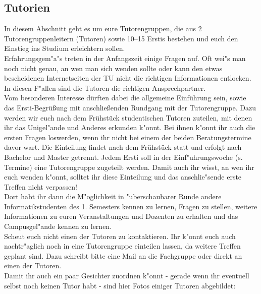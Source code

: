 \subsection{Tutorien}



In diesem Abschnitt geht es um eure Tutorengruppen, die aus 2 Tutorengruppenleitern (Tutoren) sowie 10--15 Erstis bestehen und euch den Einstieg ins Studium erleichtern sollen.\\
Erfahrungsgem"a"s treten in der Anfangszeit einige Fragen auf. Oft wei"s man noch nicht genau, an wen man sich wenden sollte oder kann den etwas bescheidenen Internetseiten der TU nicht die richtigen Informationen entlocken. In diesen F"allen sind die Tutoren die richtigen Ansprechpartner.\\

Vom besonderen Interesse dürften dabei die allgemeine Einführung sein,
sowie das Ersti-Begrüßung mit anschließenden Rundgang mit der
Tutorengruppe.
Dazu werden wir euch nach dem Frühstück studentischen 
Tutoren zuteilen, mit denen ihr das Unigel"ande und Anderes erkunden 
k"onnt. Bei ihnen k"onnt ihr auch die ersten Fragen loswerden, wenn 
ihr nicht bei einem der beiden Beratungstermine davor wart.
Die Einteilung findet nach dem Frühstück statt und erfolgt nach
Bachelor und Master getrennt.
Jedem Ersti soll in der Einf"uhrungswoche (s. Termine) eine Tutorengruppe zugeteilt werden. Damit auch ihr wisst, an wen ihr euch wenden k"onnt, solltet ihr diese Einteilung und das anschlie"sende erste Treffen nicht verpassen!\\
Dort habt ihr dann die M"oglichkeit in "uberschaubarer Runde andere Informatikstudenten des 1. Semesters kennen zu lernen, Fragen zu stellen, weitere Informationen zu euren Veranstaltungen und Dozenten zu erhalten und das Campusgel"ande kennen zu lernen.\\
Scheut euch nicht einen der Tutoren zu kontaktieren. Ihr k"onnt euch auch nachtr"aglich noch in eine Tutorengruppe einteilen lassen, da weitere Treffen geplant sind. Dazu schreibt bitte eine Mail an die Fachgruppe  oder direkt an einen der Tutoren.\\
Damit ihr auch ein paar Gesichter zuordnen k"onnt - gerade wenn ihr eventuell selbst noch keinen Tutor habt - sind hier Fotos einiger Tutoren abgebildet:

